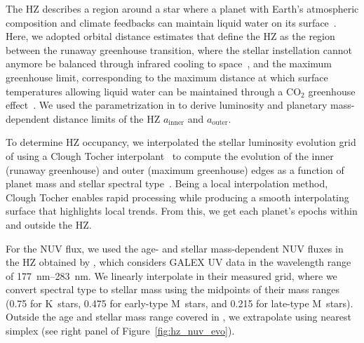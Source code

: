 \documentclass[twocolumn,twocolappendix,linenumbers]{aastex631}
\begin{document}
The \gls{HZ} describes a region around a star where a planet with Earth's atmospheric composition and climate feedbacks can maintain liquid water on its surface~\citep[e.g.,][]{Ramirez2017,Ramirez2018,MolLous2022,Spinelli2023,Tuchow2023}.
Here, we adopted orbital distance estimates that define the \gls{HZ} as the region between the runaway greenhouse transition, where the stellar instellation cannot anymore be balanced through infrared cooling to space~\citep{Ingersoll1969}, and the maximum greenhouse limit, corresponding to the maximum distance at which surface temperatures allowing liquid water can be maintained through a CO$_2$ greenhouse effect~\citep{Kasting1991,Kasting1993,Underwood2003,Kopparapu2013,Kopparapu2014}.
We used the parametrization in \citet{Kopparapu2014} to derive luminosity and planetary mass-dependent distance limits of the \gls{HZ} $a_\mathrm{inner}$ and $a_\mathrm{outer}$.


To determine \gls{HZ} occupancy, we interpolated the stellar luminosity evolution grid of \citet{Baraffe1998} using a Clough Tocher interpolant~\citep[][see left panel of Figure~\ref{fig:hz_nuv_evo}]{Nielson1983,Alfeld1984} to compute the evolution of the inner (runaway greenhouse) and outer (maximum greenhouse) edges as a function of planet mass and stellar spectral type~\citep{Kopparapu2014}.
Being a local interpolation method, Clough Tocher enables rapid processing while producing a smooth interpolating surface that highlights local trends.
From this, we get each planet's epochs within and outside the \gls{HZ}.

For the \gls{NUV} flux, we used the age- and stellar mass-dependent \gls{NUV} fluxes in the \gls{HZ} obtained by \citet{Richey-Yowell2023}, which considers GALEX \gls{UV} data in the wavelength range of \SIrange{177}{283}{\nano\meter}.
We linearly interpolate in their measured grid, where we convert spectral type to stellar mass using the midpoints of their mass ranges (\SI{0.75}{\Msun} for K~stars, \SI{0.475}{\Msun} for early-type M~stars,  and \SI{0.215}{\Msun} for late-type M~stars).
Outside the age and stellar mass range covered in \citet{Richey-Yowell2023}, we extrapolate using nearest simplex (see right panel of Figure~\ref{fig:hz_nuv_evo}).
\end{document}
